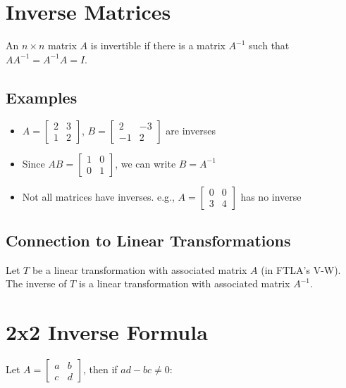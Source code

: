 \documentclass[12pt,a4paper]{article}
\begin{document}
\section{Inverse Matrices}

An $n\times n$ matrix $A$ is invertible if there is a matrix $A^{-1}$ such that $AA^{-1} = A^{-1}A = I$.

\subsection{Examples}

\begin{itemize}
    \item $A = \begin{bmatrix} 2 & 3 \\ 1 & 2 \end{bmatrix}$, $B = \begin{bmatrix} 2 & -3 \\ -1 & 2 \end{bmatrix}$ are inverses
    \item Since $AB = \begin{bmatrix} 1 & 0 \\ 0 & 1 \end{bmatrix}$, we can write $B = A^{-1}$
    \item Not all matrices have inverses. e.g., $A = \begin{bmatrix} 0 & 0 \\ 3 & 4 \end{bmatrix}$ has no inverse
\end{itemize}

\subsection{Connection to Linear Transformations}

Let $T$ be a linear transformation with associated matrix $A$ (in FTLA's V-W). The inverse of $T$ is a linear transformation with associated matrix $A^{-1}$.

\section{2x2 Inverse Formula}

Let $A = \begin{bmatrix} a & b \\ c & d \end{bmatrix}$, then if $ad-bc \neq 0$:
\end{document}
